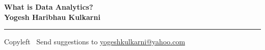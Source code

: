 
\graphicspath{{images/}}

\footnotesize


\begin{center}
\Large{\textbf{What is Data Analytics?\\ Yogesh Haribhau Kulkarni}}  
\end{center}

\begin{multicols}{2}

\end{multicols}

\rule{\linewidth}{0.25pt}
\scriptsize
Copyleft \textcopyleft\  Send suggestions to 
\href{http://yati.io}{yogeshkulkarni@yahoo.com}


